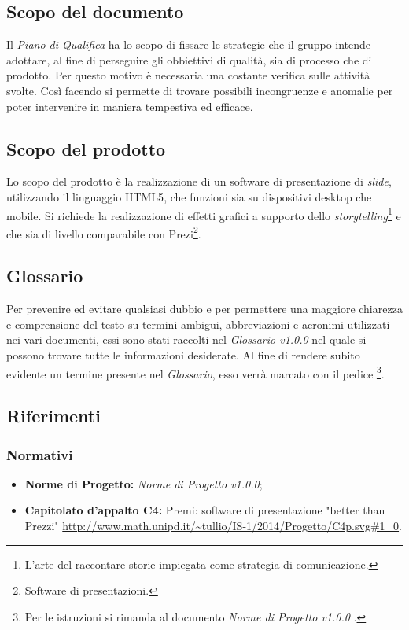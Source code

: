 \subsection{Scopo del documento}
Il \textit{Piano di Qualifica} ha lo scopo di fissare le strategie che il gruppo intende adottare, al fine di perseguire gli obbiettivi di qualità, sia di processo che di prodotto. Per questo motivo è necessaria una costante verifica sulle attività svolte. Così facendo si permette di trovare possibili incongruenze e anomalie per poter intervenire in maniera tempestiva ed efficace.
\subsection{Scopo del prodotto}
Lo scopo del prodotto è la realizzazione di un software di presentazione di \textit{\gls{slide}}, utilizzando il linguaggio \gls{HTML5}, che funzioni sia su dispositivi desktop che mobile. Si richiede la realizzazione di effetti grafici a supporto dello \textit{storytelling}\footnote{L'arte del raccontare storie impiegata come strategia di comunicazione.} e che sia di livello comparabile con Prezi\footnote{Software di presentazioni.}.
\subsection{Glossario}
Per prevenire ed evitare qualsiasi dubbio e per permettere una maggiore chiarezza e comprensione del testo su termini ambigui, abbreviazioni e acronimi utilizzati nei vari documenti, essi sono stati raccolti nel \textit{Glossario v1.0.0} nel quale si possono trovare tutte le informazioni desiderate.
Al fine di rendere subito evidente un termine presente nel \textit{Glossario}, esso verrà marcato con il pedice \G\footnote{Per le istruzioni si rimanda al documento \textit{Norme di Progetto v1.0.0} .}.
\subsection{Riferimenti}
	\subsubsection{Normativi}
	\begin{itemize}
		\item \textbf{Norme di Progetto:} \textit{Norme di Progetto v1.0.0};
		\item \textbf{Capitolato d'appalto C4:} Premi: software di presentazione "better than Prezzi" \url{http://www.math.unipd.it/~tullio/IS-1/2014/Progetto/C4p.svg#1_0}.
	\end{itemize}
